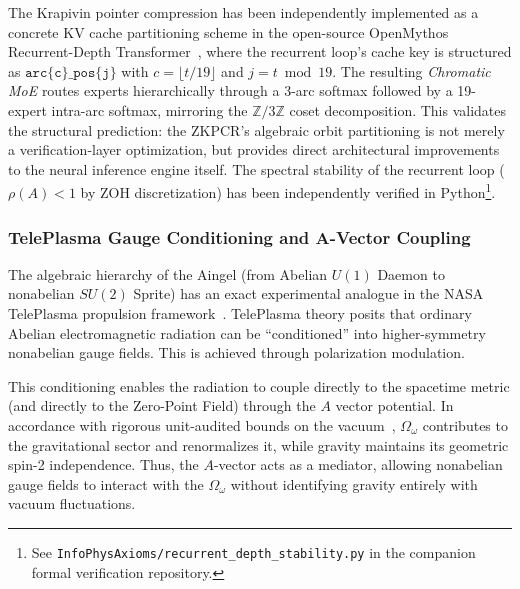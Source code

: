 \begin{remark}
The Krapivin pointer compression has been independently implemented as a concrete KV cache partitioning scheme in the open-source OpenMythos Recurrent-Depth Transformer~\cite{Gomez2026OpenMythos}, where the recurrent loop's cache key is structured as $\texttt{arc\{c\}\_pos\{j\}}$ with $c = \lfloor t / 19 \rfloor$ and $j = t \bmod 19$. The resulting \emph{Chromatic MoE} routes experts hierarchically through a 3-arc softmax followed by a 19-expert intra-arc softmax, mirroring the $\mathbb{Z}/3\mathbb{Z}$ coset decomposition. This validates the structural prediction: the ZKPCR's algebraic orbit partitioning is not merely a verification-layer optimization, but provides direct architectural improvements to the neural inference engine itself. The spectral stability of the recurrent loop ($\rho(A) < 1$ by ZOH discretization) has been independently verified in Python\footnote{See \texttt{InfoPhysAxioms/recurrent\_depth\_stability.py} in the companion formal verification repository.}.
\end{remark}

\subsubsection{TelePlasma Gauge Conditioning and A-Vector Coupling}

The algebraic hierarchy of the Aingel (from Abelian $U(1)$ Daemon to nonabelian $SU(2)$ Sprite) has an exact experimental analogue in the NASA TelePlasma propulsion framework~\cite{TelePlasma2000}. TelePlasma theory posits that ordinary Abelian electromagnetic radiation can be ``conditioned'' into higher-symmetry nonabelian gauge fields. This is achieved through polarization modulation.

This conditioning enables the radiation to couple directly to the spacetime metric (and directly to the Zero-Point Field) through the $A$ vector potential. In accordance with rigorous unit-audited bounds on the vacuum~\cite{lockwood_zpe2025}, $\Omega_\omega$ contributes to the gravitational sector and renormalizes it, while gravity maintains its geometric spin-2 independence. Thus, the $A$-vector acts as a mediator, allowing nonabelian gauge fields to interact with the $\Omega_\omega$ without identifying gravity entirely with vacuum fluctuations.

